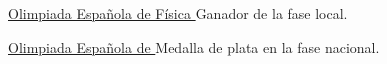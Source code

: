 \divider

\cvachievement{\faTrophy}
{\href{https://rsef.es/olimpiada-espanola-de-fisica}
  {Olimpiada Española de Física \smallskip}}
{\small {}%
  \small{}}
Ganador de la fase local.

\divider

\cvachievement{\faTrophy}
{\href{https://rsef.es/olimpiada-espanola-de-fisica}
  {Olimpiada Española de \smallskip}}
{\small{}%
  \small{}}
Medalla de plata en la fase nacional.
